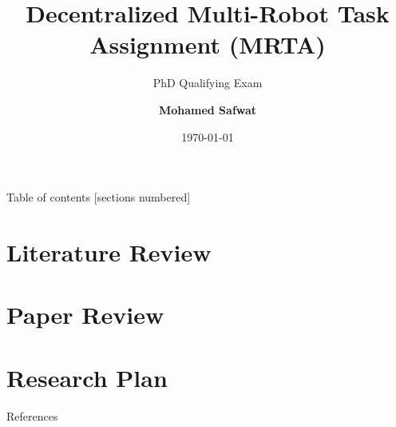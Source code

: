 \documentclass[9pt]{beamer}
\title{Decentralized Multi-Robot Task Assignment (MRTA)}
\subtitle{PhD Qualifying Exam}
\date{\today}
\author{\textbf{Mohamed Safwat}}
\institute{Department of Mechanical Engineering, \\ University of Washington Seattle}
\begin{document}
\maketitle
{}

\begin{frame}{Table of contents}
  [sections numbered]
  \tableofcontents[hideallsubsections]
\end{frame}

\section{Literature Review}


\section{Paper Review}


\section{Research Plan}

\appendix



\begin{frame}[allowframebreaks]{References}
    
    
\end{frame}
\end{document}
